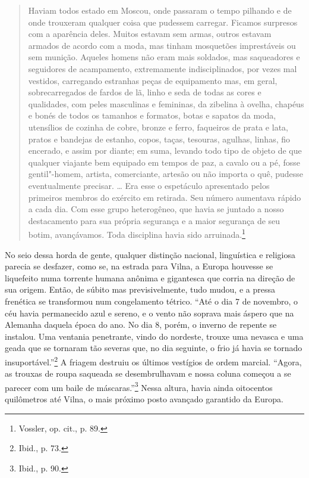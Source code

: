 \begin{quote}
Haviam todos estado em Moscou, onde passaram o tempo pilhando e de onde
trouxeram qualquer coisa que pudessem carregar. Ficamos surpresos com a
aparência deles. Muitos estavam sem armas, outros estavam armados de
acordo com a moda, mas tinham mosquetões imprestáveis ou sem munição.
Aqueles homens não eram mais soldados, mas saqueadores e seguidores de
acampamento, extremamente indisciplinados, por vezes mal vestidos,
carregando estranhas peças de equipamento mas, em geral, sobrecarregados
de fardos de lã, linho e seda de todas as cores e qualidades, com peles
masculinas e femininas, da zibelina à ovelha, chapéus e bonés de todos
os tamanhos e formatos, botas e sapatos da moda, utensílios de cozinha
de cobre, bronze e ferro, faqueiros de prata e lata, pratos e bandejas
de estanho, copos, taças, tesouras, agulhas, linhas, fio encerado, e
assim por diante; em suma, levando todo tipo de objeto de que qualquer
viajante bem equipado em tempos de paz, a cavalo ou a pé, fosse
gentil"-homem, artista, comerciante, artesão ou não importa o quê,
pudesse eventualmente precisar. \ldots{} Era esse o espetáculo
apresentado pelos primeiros membros do exército em retirada. Seu número
aumentava rápido a cada dia. Com esse grupo heterogêneo, que havia se
juntado a nosso destacamento para sua própria segurança e a maior
segurança de seu botim, avançávamos. Toda disciplina havia sido
arruinada.\footnote{Vossler, op. cit., p. 89.}
\end{quote}

No seio dessa horda de gente, qualquer distinção nacional, linguística e
religiosa parecia se desfazer, como se, na estrada para Vilna, a Europa
houvesse se liquefeito numa torrente humana anônima e gigantesca que
corria na direção de sua origem. Então, de súbito mas previsivelmente,
tudo mudou, e a pressa frenética se transformou num congelamento
tétrico. ``Até o dia 7 de novembro, o céu havia permanecido azul e
sereno, e o vento não soprava mais áspero que na Alemanha daquela época
do ano. No dia 8, porém, o inverno de repente se instalou. Uma ventania
penetrante, vindo do nordeste, trouxe uma nevasca e uma geada que se
tornaram tão severas que, no dia seguinte, o frio já havia se tornado
insuportável.''\footnote{Ibid., p. 73.} A friagem destruiu os últimos
vestígios de ordem marcial. ``Agora, as trouxas de roupa saqueada se
desembrulhavam e nossa coluna começou a se parecer com um baile de
máscaras.''\footnote{Ibid., p. 90.} Nessa altura, havia ainda oitocentos
quilômetros até Vilna, o mais próximo posto avançado garantido da
Europa.

